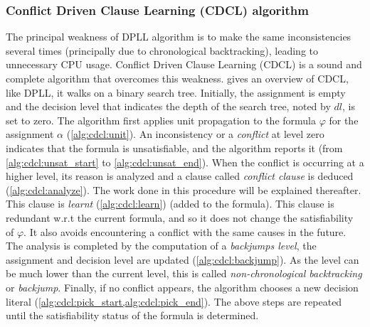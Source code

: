 %
%
\subsubsection{Conflict Driven Clause Learning (CDCL) algorithm}\label{sec:cdcl}
The principal weakness of DPLL algorithm is to make the same inconsistencies several times
(principally due to chronological backtracking), leading to  unnecessary CPU usage.
Conflict Driven Clause Learning (CDCL) \cite{marques1999grasp} is a sound and complete algorithm
that overcomes this weakness.
 gives an overview of CDCL, like DPLL,  it walks on a binary search tree.
Initially, the  assignment is empty and the decision level that 
indicates the depth of the search tree, noted by $\mathit{dl}$, is set to zero.
The algorithm first applies unit propagation to the formula $\varphi$ for the  assignment $\alpha$ (\cref{alg:cdcl:unit}).
An inconsistency or a \emph{conflict} at level zero indicates that the formula is unsatisfiable, and the algorithm
reports it (from \cref{alg:cdcl:unsat_start} to \cref{alg:cdcl:unsat_end}). When the conflict is occurring at a higher level,
 its reason is analyzed and a clause called \emph{conflict clause} is deduced (\cref{alg:cdcl:analyze}).
The work done in this procedure will be explained thereafter.
This clause is \emph{learnt} (\cref{alg:cdcl:learn}) (added to the formula). This clause is redundant w.r.t the current
formula, and so it does not change the satisfiability of $\varphi$. It also avoids encountering a conflict with the same
causes in the future. %
The analysis is completed by the computation of a \emph{backjumps level}, the assignment and decision level are updated (\cref{alg:cdcl:backjump}).
 As the level can be much lower than the current level, this is called \emph{non-chronological backtracking} or \textit{backjump}.
Finally, if no conflict appears, the algorithm chooses a new decision literal 
(\cref{alg:cdcl:pick_start,alg:cdcl:pick_end}).
The above steps are repeated until the satisfiability status of the formula is determined.





